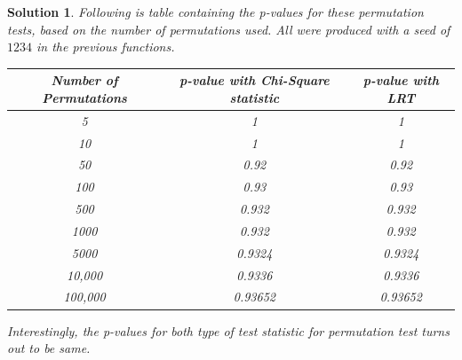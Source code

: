 \documentclass[12pt]{article}
\theoremstyle{problemstyle}
\newtheorem*{solution*}{Solution}
\begin{document}
\begin{solution*}
Following is table containing the p-values for these permutation tests, based on the number of permutations used. All were produced with a seed of $1234$ in the previous functions.

\begin{center}
	\begin{tabular}{|c|c|c|}
		\hline
		Number of Permutations & p-value with Chi-Square statistic & p-value with LRT\\
		\hline
		5 & 1 & 1\\
		10 & 1 & 1\\
		50 & 0.92 & 0.92 \\
		100 & 0.93 & 0.93 \\
		500 & 0.932 & 0.932 \\
		1000 & 0.932 & 0.932 \\
		5000 & 0.9324 & 0.9324 \\
		10,000 & 0.9336 & 0.9336 \\
		100,000 & 0.93652 & 0.93652\\
		\hline 
	\end{tabular}	
\end{center}

Interestingly, the p-values for both type of test statistic for permutation test turns out to be same.

\end{solution*}
\vskip3pt
\end{document}

